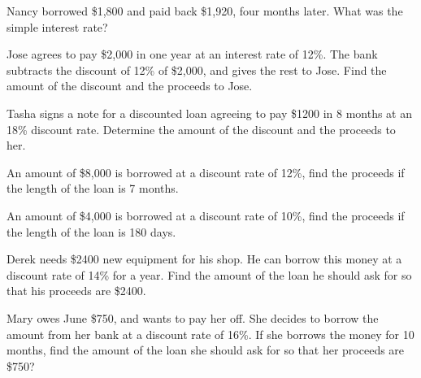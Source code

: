 \begin{puzzle}
    Nancy borrowed \$1,800 and paid back \$1,920, four months later. What was the simple interest rate?
\end{puzzle}

\begin{puzzle}
    Jose agrees to pay \$2,000 in one year at an interest rate of 12\%. The bank subtracts the discount of 12\% of \$2,000, and gives the rest to Jose. Find the amount of the discount and the proceeds to Jose.
\end{puzzle}

\begin{puzzle}
    Tasha signs a note for a discounted loan agreeing to pay \$1200 in 8 months at an 18\% discount rate. Determine the amount of the discount and the proceeds to her.
\end{puzzle}

\begin{puzzle}
    An amount of \$8,000 is borrowed at a discount rate of 12\%, find the proceeds if the length of the loan is 7 months.
\end{puzzle}

\begin{puzzle}
    An amount of \$4,000 is borrowed at a discount rate of 10\%, find the proceeds if the length of the loan is 180 days.
\end{puzzle}

\begin{puzzle}
    Derek needs \$2400 new equipment for his shop. He can borrow this money at a discount rate of 14\% for a year. Find the amount of the loan he should ask for so that his proceeds are \$2400.
\end{puzzle}

\begin{puzzle}
    Mary owes June \$750, and wants to pay her off. She decides to borrow the amount from her bank at a discount rate of 16\%. If she borrows the money for 10 months, find the amount of the loan she should ask for so that her proceeds are \$750?
\end{puzzle}